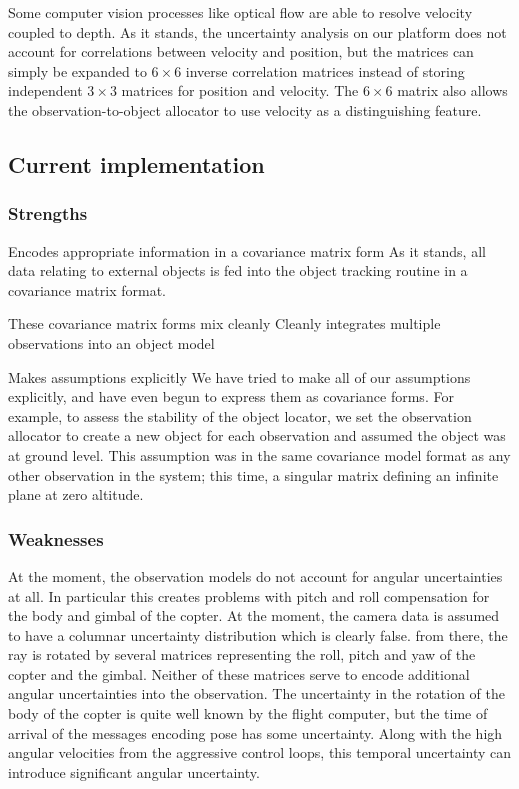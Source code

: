 \documentclass[a4paper, 11pt, titlepage]{article}
\begin{document}
      Some computer vision processes like optical flow are able to resolve velocity coupled to depth.
      As it stands, the uncertainty analysis on our platform does not account for correlations between velocity and position, but the matrices can simply be expanded to \(6\times6\) inverse correlation matrices instead of storing independent \(3\times3\) matrices for position and velocity.  The \(6\times6\) matrix also allows the observation-to-object allocator to use velocity as a distinguishing feature.

  \subsection{Current implementation}
    \subsubsection{Strengths}
      
      Encodes appropriate information in a covariance matrix form
      As it stands, all data relating to external objects is fed into the object tracking routine in a covariance matrix format.  

      These covariance matrix forms mix cleanly 
      Cleanly integrates multiple observations into an object model

      Makes assumptions explicitly
      We have tried to make all of our assumptions explicitly, and have even begun to express them as covariance forms.
      For example, to assess the stability of the object locator, we set the observation allocator to create a new object for each observation and assumed the object was at ground level.  This assumption was in the same covariance model format as any other observation in the system; this time, a singular matrix defining an infinite plane at zero altitude.


    \subsubsection{Weaknesses}
      At the moment, the observation models do not account for angular uncertainties at all.  In particular this creates problems with pitch and roll compensation for the body and gimbal of the copter.
      At the moment, the camera data is assumed to have a columnar uncertainty distribution which is clearly false.  from there, the ray is rotated by several matrices representing the roll, pitch and yaw of the copter and the gimbal.  Neither of these matrices serve to encode additional angular uncertainties into the observation.
      The uncertainty in the rotation of the body of the copter is quite well known by the flight computer, but the time of arrival of the messages encoding pose has some uncertainty.  Along with the high angular velocities from the aggressive control loops, this temporal uncertainty can introduce significant angular uncertainty.
\end{document}
